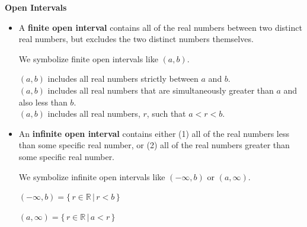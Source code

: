 \documentclass{ximera}
\begin{document}
\begin{definition}  \textbf{\textcolor{green!50!black}{Open Intervals}} 



\begin{itemize}
\item A \textbf{finite open interval} contains all of the real numbers between two distinct real numbers, but excludes the two distinct numbers themselves.

We symbolize finite open intervals like $(a, b)$. 

$(a,b)$ includes all real numbers strictly between $a$ and $b$. \\ 
$(a,b)$ includes all real numbers that are simultaneously greater than $a$ and also less than $b$.  \\
$(a,b)$ includes all real numbers, $r$, such that $a < r < b$.



\item An \textbf{infinite open interval} contains either (1) all of the real numbers less than some specific real number, or (2) all of the real numbers greater than some specific real number. 

We symbolize infinite open intervals like $(-\infty, b)$ or $(a, \infty)$. 

$(-\infty, b) = \{ \, r \in \mathbb{R} \, | \,  r < b   \,  \}$

$(a, \infty) = \{ \, r \in \mathbb{R} \, | \,  a < r   \,  \}$

\end{itemize}

\end{definition}
\end{document}
